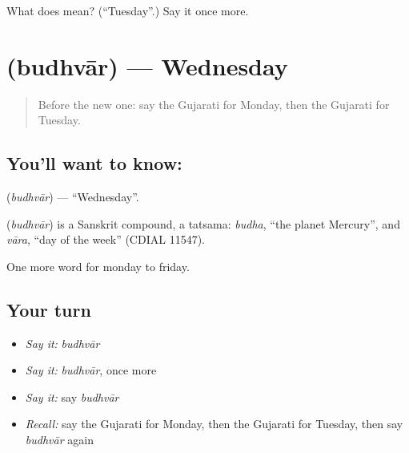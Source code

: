 \begin{tcolorbox}[breakable,colback=teal!4,colframe=teal!35!black,title={Before you move on}]
What does  mean? (\textquotedblleft{}Tuesday\textquotedblright{}.) Say it once more.
\end{tcolorbox}
\section[\texorpdfstring{\gu{બુધવાર} (budhvār)}{બુધવાર (budhvār)}]{ (budhvār) — Wednesday}

\label{lesson:GU-C78-wednesday}



\begin{quote}
Before the new one: say the Gujarati for Monday, then the Gujarati for Tuesday.
\end{quote}

\subsection*{You'll want to know: }
\textbf{} (\emph{budhvār}) — \textquotedblleft{}Wednesday\textquotedblright{}.

\begin{cousinweb}
\textbf{} (\emph{budhvār}) is a Sanskrit compound, a tatsama: \emph{budha}, \textquotedblleft{}the planet Mercury\textquotedblright{}, and \emph{vāra}, \textquotedblleft{}day of the week\textquotedblright{} (CDIAL 11547).
\end{cousinweb}

\begin{grammarlens}[title={What you've built}]
One more word for monday to friday.
\end{grammarlens}

\subsection*{Your turn}
\begin{itemize}
\raggedright
  \item \emph{Say it:} \emph{budhvār}
  \item \emph{Say it:} \emph{budhvār}, once more
  \item \emph{Say it:} say \emph{budhvār}
  \item \emph{Recall:} say the Gujarati for Monday, then the Gujarati for Tuesday, then say \emph{budhvār} again
\end{itemize}


